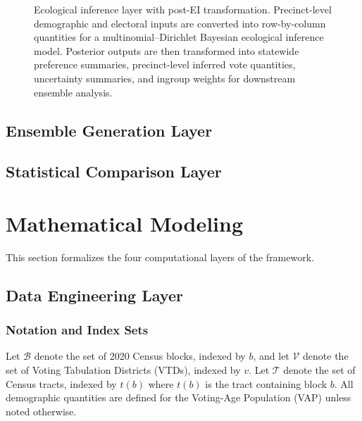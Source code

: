 \documentclass[sn-vancouver,Numbered]{sn-jnl}
\theoremstyle{thmstyleone}%
\theoremstyle{thmstyletwo}%
\theoremstyle{thmstylethree}%
\begin{document}
\begin{figure}[t]
\caption{Ecological inference layer with post-EI transformation. Precinct-level demographic and electoral inputs are converted into row-by-column quantities for a multinomial--Dirichlet Bayesian ecological inference model. Posterior outputs are then transformed into statewide preference summaries, precinct-level inferred vote quantities, uncertainty summaries, and ingroup weights for downstream ensemble analysis.}
\label{fig:ei_postei_layer}
\end{figure}


\subsection{Ensemble Generation Layer}
\subsection{Statistical Comparison Layer}

\section{Mathematical Modeling}
This section formalizes the four computational layers of the framework.

\subsection{Data Engineering Layer}
\subsubsection{Notation and Index Sets}
Let $\mathcal{B}$ denote the set of 2020 Census blocks, indexed by $b$, and let $\mathcal{V}$ denote the set of Voting Tabulation Districts (VTDs), indexed by $v$. Let $\mathcal{T}$ denote the set of Census tracts, indexed by $t(b)$ where $t(b)$ is the tract containing block $b$. All demographic quantities are defined for the Voting-Age Population (VAP) unless noted otherwise.
\end{document}
